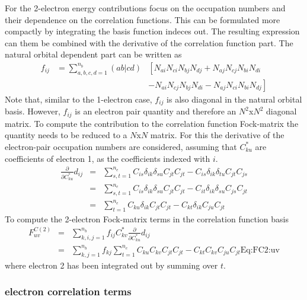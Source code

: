 \documentclass[pra,nofootinbib]{revtex4-1}
\newcommand{\dlabel}[1]{\text{#1}\label{#1}}
\begin{document}
For the 2-electron energy contributions focus on the occupation numbers
and their dependence on the correlation functions. This can be formulated
more compactly by integrating the basis function indeces out.
The resulting expression can them be 
combined with the derivative of the correlation function part. The natural
orbital dependent part can be written as
\begin{eqnarray}
   f_{ij} 
   &= \sum_{a,b,c,d=1}^{n_b}(ab|cd)&\left[
       N_{ai}N_{ci}N_{bj}N_{dj}+N_{aj}N_{cj}N_{bi}N_{di}
       \right. \nonumber \\
   &&  \left.
      -N_{ai}N_{cj}N_{bj}N_{di}-N_{aj}N_{ci}N_{bi}N_{dj}
       \right]
\end{eqnarray}
Note that, similar to the 1-electron case, $f_{ij}$ is also diagonal in the
natural orbital basis. However, $f_{ij}$ is an electron pair quantity and
therefore an $N^2$x$N^2$ diagonal matrix. To compute the contribution
to the correlation function Fock-matrix the quantity needs to be reduced
to a $N$x$N$ matrix. For this the derivative of the electron-pair occupation
numbers are considered, assuming that $C^*_{ku}$ are coefficients of electron 1, 
as the coefficients indexed with $i$.
\begin{eqnarray}
   \frac{\partial}{\partial C^*_{ku}}d_{ij}
   &=& \sum_{s,t=1}^{n_e}
       C_{is}\delta_{ik}\delta_{su}C_{jt}C_{jt}
      -C_{is}\delta_{ik}\delta_{tu}C_{jt}C_{js} \\
   &=& \sum_{s,t=1}^{n_e}
       C_{is}\delta_{ik}\delta_{su}C_{jt}C_{jt}
      -C_{it}\delta_{ik}\delta_{su}C_{js}C_{jt} \\
   &=& \sum_{t=1}^{n_e}
       C_{ku}\delta_{ik}C_{jt}C_{jt}
      -C_{kt}\delta_{ik}C_{ju}C_{jt}
\end{eqnarray}
To compute the 2-electron Fock-matrix terms in the correlation function basis
\begin{eqnarray}
  F^{C(2)}_{uv}
  &=& \sum_{k,i,j=1}^{n_b}f_{ij}C^*_{kv}\frac{\partial}{\partial C^*_{ku}}d_{ij}
      \\
  &=& \sum_{k,j=1}^{n_b}f_{kj}\sum_{t=1}^{n_e}
      C_{ku}C_{kv}C_{jt}C_{jt}
     -C_{kt}C_{kv}C_{ju}C_{jt}
      \dlabel{Eq:FC2:uv}
\end{eqnarray}
where electron 2 has been integrated out by summing over $t$.

\subsubsection{electron correlation terms}
\end{document}
